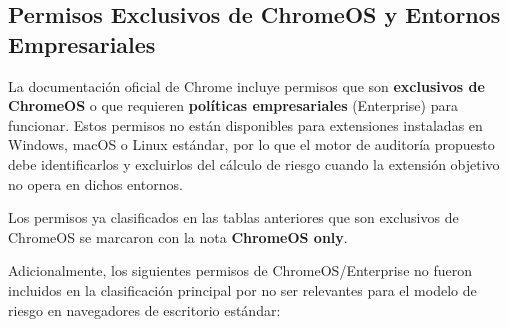 \documentclass[12pt,oneside]{report}
\begin{document}
\subsection{Permisos Exclusivos de ChromeOS y Entornos Empresariales}
\label{sec:chromeos_permissions}

La documentación oficial de Chrome incluye permisos que son \textbf{exclusivos de ChromeOS} o que requieren \textbf{políticas empresariales} (Enterprise) para funcionar. Estos permisos no están disponibles para extensiones instaladas en Windows, macOS o Linux estándar, por lo que el motor de auditoría propuesto debe identificarlos y excluirlos del cálculo de riesgo cuando la extensión objetivo no opera en dichos entornos.

Los permisos ya clasificados en las tablas anteriores que son exclusivos de ChromeOS se marcaron con la nota \textbf{ChromeOS only}.

Adicionalmente, los siguientes permisos de ChromeOS/Enterprise no fueron incluidos en la clasificación principal por no ser relevantes para el modelo de riesgo en navegadores de escritorio estándar:
\end{document}
